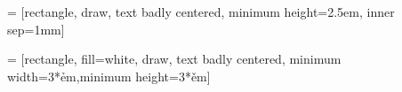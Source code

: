 % 


 = [rectangle, draw, text badly centered, minimum height=2.5em, inner sep=1mm]

 =
[rectangle, fill=white, draw, text badly centered, minimum width=3*\h em,minimum height=3*\v em]

\newcommand{\bloq}[4]{%
	\node[bloq,#3] (#2) at (#1) {\textsf{#4}};
}
\newcommand{\add}[2]{%
	\draw (4,4) circle [radius=0.3] node (add) {\textsf$+$};
}

\newcommand{\propnode}[5]{%
	\pgfmathsetmacro{\minimalwidth}{sqrt (#4*\nodebasesize)}
	\node[#3,minimum width=\minimalwidth*1cm,inner sep=\nodeinnersep*0cm,circle,draw]
	(#2) at (#1) {#5};
}


